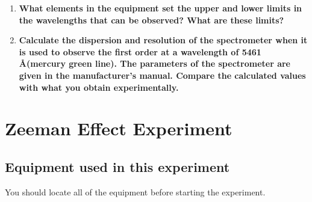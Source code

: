 \documentclass{../lab}
\begin{document}

    \begin{enumerate}

       \item \textbf{What elements in the equipment set the upper and lower limits in the wavelengths that can be observed? What are these limits?}

       \item \textbf{Calculate the dispersion and resolution of the spectrometer when it is used to observe the first order at a wavelength of 5461 \AA (mercury green line). The parameters of the spectrometer are given in the manufacturer's manual. Compare the calculated values with what you obtain experimentally.}

    \end{enumerate} 


\section{Zeeman Effect Experiment}

\subsection{Equipment used in this experiment}

You should locate all of the equipment before starting the experiment.
\end{document}
